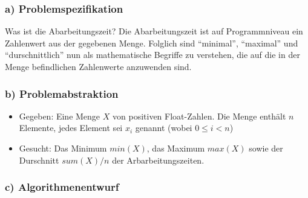\documentclass{article}
\begin{document}
    \subsubsection*{a) Problemspezifikation}
    Was ist die Abarbeitungszeit? Die Abarbeitungszeit ist auf Programmniveau ein Zahlenwert aus der gegebenen
    Menge. Folglich sind "`minimal"', "`maximal"' und "`durschnittlich"' nun als mathematische Begriffe zu verstehen, 
    die auf die in der Menge befindlichen Zahlenwerte anzuwenden sind. 

    \subsubsection*{b) Problemabstraktion}
    \begin{itemize}
        \item Gegeben: Eine Menge $X$ von positiven Float-Zahlen. Die Menge enthält $n$ Elemente, jedes Element sei $x_i$ genannt (wobei $0\le i <n$)
        \item Gesucht: Das Minimum $min(X)$, das Maximum $max(X)$ sowie der Durschnitt $sum(X)/n$ der Arbarbeitungszeiten.
    \end{itemize}


    \subsubsection*{c) Algorithmenentwurf}
\end{document}
